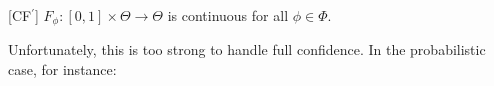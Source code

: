\begin{CFaxioms}[nosep]
	\item
	[CF{\the\numexpr\value{CFaxiomsi}\relax}${^\prime}$]
	$F_\phi : [0,1] \times \Theta \to \Theta$ is continuous
	for all $\phi \in \Phi$.
	\label{ax:cont-strong}
\end{CFaxioms}

Unfortunately, this is too strong to handle full confidence.
In the probabilistic case, for instance:


